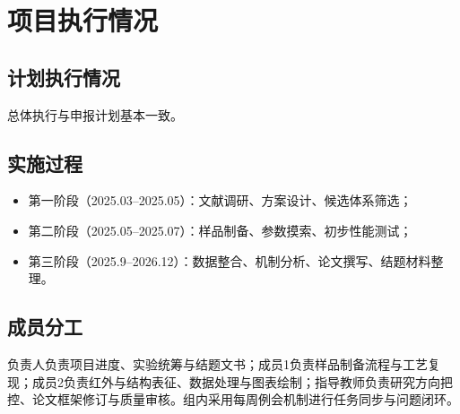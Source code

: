 \chapter{项目执行情况}

\section{计划执行情况}
总体执行与申报计划基本一致。
\section{实施过程}
\begin{itemize}
  \item 第一阶段（2025.03--2025.05）：文献调研、方案设计、候选体系筛选；
  \item 第二阶段（2025.05--2025.07）：样品制备、参数摸索、初步性能测试；
  \item 第三阶段（2025.9--2026.12）：数据整合、机制分析、论文撰写、结题材料整理。
\end{itemize}

\section{成员分工}
负责人负责项目进度、实验统筹与结题文书；成员1负责样品制备流程与工艺复现；成员2负责红外与结构表征、数据处理与图表绘制；指导教师负责研究方向把控、论文框架修订与质量审核。组内采用每周例会机制进行任务同步与问题闭环。
